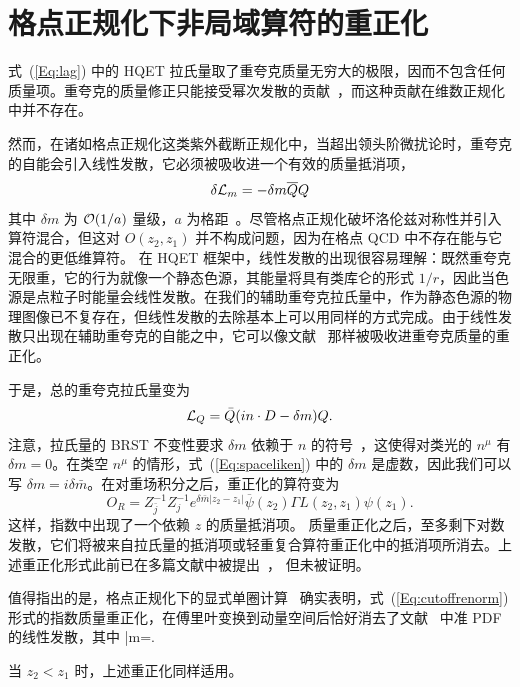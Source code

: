 \section{格点正规化下非局域算符的重正化}

式~(\ref{Eq:lag}) 中的 HQET 拉氏量取了重夸克质量无穷大的极限，因而不包含任何质量项。重夸克的质量修正只能接受幂次发散的贡献~\cite{Maiani:1991az}，而这种贡献在维数正规化中并不存在。

然而，在诸如格点正规化这类紫外截断正规化中，当超出领头阶微扰论时，重夸克的自能会引入线性发散，它必须被吸收进一个有效的质量抵消项，
\begin{equation}
    \delta {\cal L}_m =  -\delta m\overline{Q} Q
\end{equation}
其中 $\delta m$ 为 ${\cal O}(1/a)$ 量级，$a$ 为格距~\cite{Maiani:1991az}。尽管格点正规化破坏洛伦兹对称性并引入算符混合，但这对 $O(z_2,z_1)$ 并不构成问题，因为在格点 QCD 中不存在能与它混合的更低维算符。
在 HQET 框架中，线性发散的出现很容易理解：既然重夸克无限重，它的行为就像一个静态色源，其能量将具有类库仑的形式 $1/r$，因此当色源是点粒子时能量会线性发散。在我们的辅助重夸克拉氏量中，作为静态色源的物理图像已不复存在，但线性发散的去除基本上可以用同样的方式完成。由于线性发散只出现在辅助重夸克的自能之中，它可以像文献~\cite{Maiani:1991az} 那样被吸收进重夸克质量的重正化。

于是，总的重夸克拉氏量变为
\begin{equation}\label{Eq:spaceliken}
    {\cal L}_Q = \bar Q (i n\cdot D-\delta m)Q.
\end{equation}
注意，拉氏量的 BRST 不变性要求 $\delta m$ 依赖于 $n$ 的符号~\cite{Dorn:1986dt}，这使得对类光的 $n^\mu$ 有 $\delta m=0$。在类空 $n^\mu$ 的情形，式~(\ref{Eq:spaceliken}) 中的 $\delta m$ 是虚数，因此我们可以写 $\delta m=i\delta {\bar m}$。在对重场积分之后，重正化的算符变为
\begin{equation}\label{Eq:cutoffrenorm}
        O_R = Z_{\bar j}^{-1}Z_{j}^{-1}e^{\delta \bar m|z_2-z_1|}\overline{\psi}(z_2) \Gamma L(z_2,z_1)\psi(z_1).
\end{equation}
这样，指数中出现了一个依赖 $z$ 的质量抵消项。
质量重正化之后，至多剩下对数发散，它们将被来自拉氏量的抵消项或轻重复合算符重正化中的抵消项所消去。上述重正化形式此前已在多篇文献中被提出~\cite{Musch:2010ka,Ishikawa:2016znu,Chen:2016fxx,Constantinou:2017sej,Alexandrou:2017huk,Chen:2017mzz}，
但未被证明。

值得指出的是，格点正规化下的显式单圈计算~\cite{Chen:2016fxx} 确实表明，式~(\ref{Eq:cutoffrenorm}) 形式的指数质量重正化，在傅里叶变换到动量空间后恰好消去了文献~\cite{Xiong:2013bka} 中准 PDF 的线性发散，其中
\beq
\delta \bar m=.
\eeq

当 $z_2<z_1$ 时，上述重正化同样适用。
